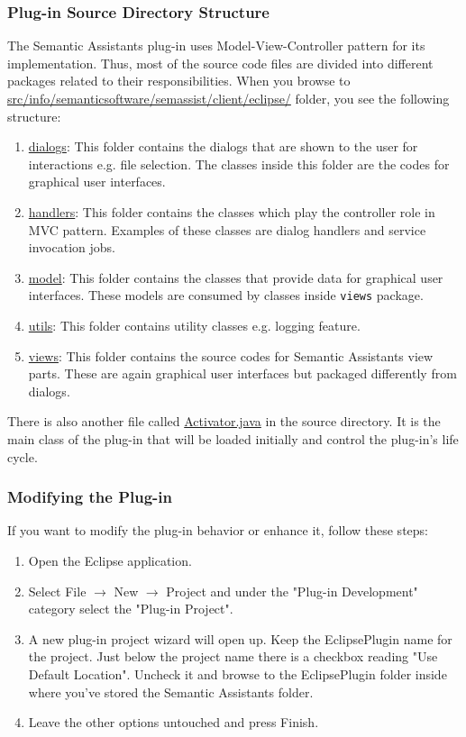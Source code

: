 \subsubsection{Plug-in Source Directory Structure}
The Semantic Assistants plug-in uses Model-View-Controller pattern for its
implementation. Thus, most of the source code files are divided into different
packages related to their responsibilities. When you browse to
\url{src/info/semanticsoftware/semassist/client/eclipse/} folder, you see the
following structure:
\begin{enumerate}
\item\url{dialogs}: This folder contains the dialogs that are shown to the user
for interactions e.g. file selection. The classes inside this folder are the
codes for graphical user interfaces.
\item\url{handlers}: This folder contains the classes which play the controller
role in MVC pattern. Examples of these classes are dialog handlers and service
invocation jobs.
\item\url{model}: This folder contains the classes that provide data for
graphical user interfaces. These models are consumed by classes inside
\texttt{views} package.
\item\url{utils}: This folder contains utility classes e.g. logging feature.
\item\url{views}: This folder contains the source codes for Semantic Assistants
view parts. These are again graphical user interfaces but packaged differently
from dialogs.
\end{enumerate}

There is also another file called \url{Activator.java} in the source directory.
It is the main class of the plug-in that will be loaded initially and control
the plug-in's life cycle.

\subsubsection{Modifying the Plug-in}
If you want to modify the plug-in behavior or enhance it, follow these steps:
\begin{enumerate}
\item Open the Eclipse application.
\item Select File $\rightarrow$ New  $\rightarrow$ Project and under the
"Plug-in Development" category select the "Plug-in Project".
\item A new plug-in project wizard will open up. Keep the EclipsePlugin name for
the project. Just below the project name there is a checkbox reading "Use
Default Location". Uncheck it and browse to the EclipsePlugin folder inside
where you've stored the Semantic Assistants folder.
\item Leave the other options untouched and press Finish.
\end{enumerate}

